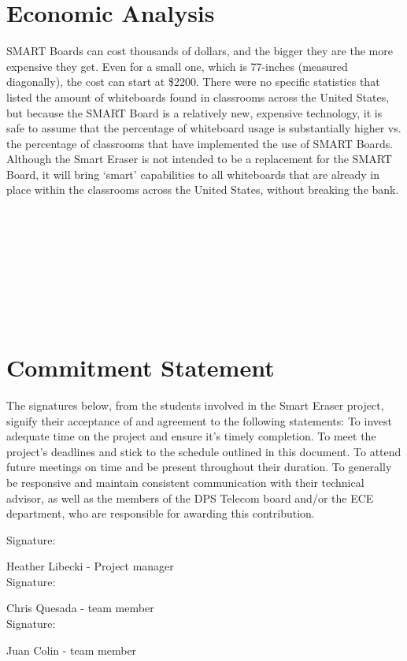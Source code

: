 \documentclass[10pt,onecolumn,draftcls]{IEEEtran} 					%
\begin{document}
	\section{Economic Analysis}
	\setlength{\parindent}{5ex}
	SMART Boards can cost thousands of dollars, and the bigger they are the more expensive they get. Even for a small one, which is 77-inches (measured diagonally), the cost can start at \$2200. There were no specific statistics that listed the amount of whiteboards found in classrooms across the United States, but because the SMART Board is a relatively new, expensive technology, it is safe to assume that the percentage of whiteboard usage is substantially higher vs. the percentage of classrooms that have implemented the use of SMART Boards. Although the Smart Eraser is not intended to be a replacement for the SMART Board, it will bring {\lq}smart{\rq} capabilities to all whiteboards that are already in place within the classrooms across the United States, without breaking the bank.\\\\\\\\\\\\\\\\\\
	\section{Commitment Statement}
	\setlength{\parindent}{5ex}
	The signatures below, from the students involved in the Smart Eraser project, signify their acceptance of and agreement to the following statements:
	To invest adequate time on the project and ensure it{\rq}s timely completion.
	To meet the project{\rq}s deadlines and stick to the schedule outlined in this document.
	To attend future meetings on time and be present throughout their duration.
	To generally be responsive and maintain consistent communication with their technical advisor, as well as the members of the DPS Telecom board and/or the ECE department, who are responsible for awarding this contribution.\\
	\begin{flushleft}
	Signature: \hrulefill
	
	\hspace*{0mm}\phantom{Approved: }Heather Libecki - Project manager\\
	\vspace{12pt}
	Signature: \hrulefill
	
	\hspace*{0mm}\phantom{Approved: }Chris Quesada - team member\\
	\vspace{12pt}
	Signature: \hrulefill
	
	\hspace*{0mm}\phantom{Approved: }Juan Colin - team member\\
	
	\end{flushleft}\par
	\setlength{\parindent}{5ex}
\end{document}
